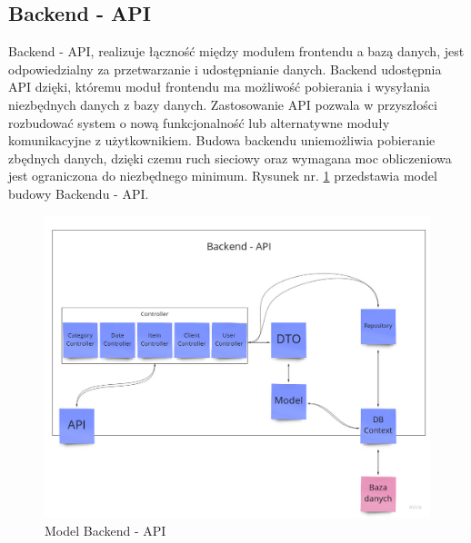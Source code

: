 \documentclass[12pt,a4paper]{article}
\begin{document}
		\subsection{Backend - API}
		\indent Backend - API, realizuje łączność między modułem frontendu a bazą danych, jest odpowiedzialny za przetwarzanie i udostępnianie danych. Backend udostępnia API
			dzięki, któremu	moduł frontendu ma możliwość pobierania i wysyłania niezbędnych danych z bazy danych. Zastosowanie API pozwala w przyszłości rozbudować system o nową
			funkcjonalność lub alternatywne moduły komunikacyjne z użytkownikiem. Budowa backendu uniemożliwia pobieranie zbędnych danych, dzięki czemu ruch sieciowy oraz wymagana moc
			obliczeniowa jest ograniczona do niezbędnego minimum. Rysunek nr. \ref{fig:api_model} przedstawia model budowy Backendu - API.\\
		\begin{figure}[h]
			\centering
			\includegraphics[width=\textwidth]{img/Backend-API_model.jpg}
			\caption{Model Backend - API}
			\label{fig:api_model}
		\end{figure}
\end{document}
